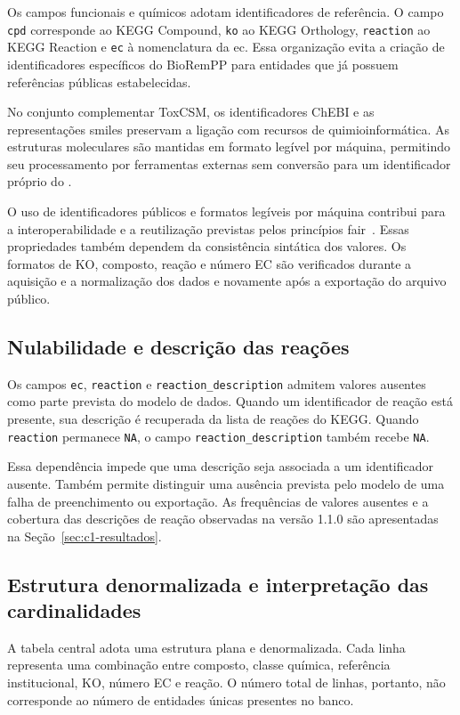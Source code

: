 Os campos funcionais e químicos adotam identificadores de referência.
O campo \texttt{cpd} corresponde ao KEGG Compound, \texttt{ko} ao KEGG
Orthology, \texttt{reaction} ao KEGG Reaction e \texttt{ec} à nomenclatura
da \gls{ec}. Essa organização evita a criação de identificadores específicos
do BioRemPP para entidades que já possuem referências públicas estabelecidas.

No conjunto complementar ToxCSM, os identificadores ChEBI e as representações
\gls{smiles} preservam a ligação com recursos de quimioinformática. As
estruturas moleculares são mantidas em formato legível por máquina, permitindo
seu processamento por ferramentas externas sem conversão para um identificador
próprio do \biorempp{}.

O uso de identificadores públicos e formatos legíveis por máquina contribui
para a interoperabilidade e a reutilização previstas pelos princípios
\gls{fair}~\cite{wilkinson2016fair}. Essas propriedades
também dependem da consistência sintática dos valores. Os formatos de KO,
composto, reação e número EC são verificados durante a aquisição e a
normalização dos dados e novamente após a exportação do arquivo público.

\subsection{Nulabilidade e descrição das reações}

Os campos \texttt{ec}, \texttt{reaction} e
\texttt{reaction\_description} admitem valores ausentes como parte prevista
do modelo de dados. Quando um identificador de reação está presente, sua
descrição é recuperada da lista de reações do KEGG. Quando
\texttt{reaction} permanece \texttt{NA}, o campo
\texttt{reaction\_description} também recebe \texttt{NA}.

Essa dependência impede que uma descrição seja associada a um identificador
ausente. Também permite distinguir uma ausência prevista pelo modelo de uma
falha de preenchimento ou exportação. As frequências de valores ausentes e a
cobertura das descrições de reação observadas na versão 1.1.0 são apresentadas
na Seção~\ref{sec:c1-resultados}.

\subsection{Estrutura denormalizada e interpretação das cardinalidades}

A tabela central adota uma estrutura plana e denormalizada. Cada linha
representa uma combinação entre composto, classe química, referência
institucional, KO, número EC e reação. O número total de linhas, portanto,
não corresponde ao número de entidades únicas presentes no banco.

